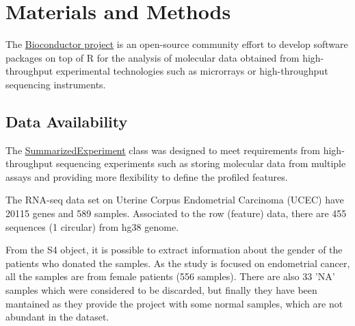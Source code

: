 \documentclass[9pt,twocolumn,twoside]{gsajnl}
\begin{document}



\section*{Materials and Methods}

The \href{http://www.bioconductor.org}{Bioconductor project} is an open-source community effort to develop software packages on top of R for the analysis of molecular data obtained from high-throughput experimental technologies such as microrrays or high-throughput sequencing instruments.


\subsection*{Data Availability}
The \href{http://bioconductor.org/packages/release/bioc/html/SummarizedExperiment.html}{SummarizedExperiment} class was designed to meet requirements from high-throughput sequencing experiments such as storing molecular data from multiple assays and providing more flexibility to define the profiled features.

The RNA-seq data set on Uterine Corpus Endometrial Carcinoma (UCEC) have 20115 genes and 589 samples. Associated to the row (feature) data, there are 455 sequences (1 circular) from hg38 genome.

From the S4 object, it is possible to extract information about the gender of the patients who donated the samples. As the study is focused on endometrial cancer, all the samples are from female patients (556 samples). There are also 33 'NA' samples which were considered to be discarded, but finally they have been mantained as they provide the project with some normal samples, which are not abundant in the dataset.
\end{document}
